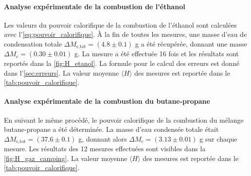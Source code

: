 \paragraph*{Analyse expérimentale de la combustion de l'éthanol}
Les valeurs du pouvoir calorifique de la combustion de l'éthanol sont calculées avec l'\autoref{eq:pouvoir_calorifique}. À la fin de toutes les mesures, une masse d'eau de condensation totale \(\Delta M_\textrm{c,tot} = (4.8 \pm 0.1)\) \si{\gram} a été récupérée, donnant une masse \(\Delta M_c = (0.30 \pm 0.01)\) \si{\gram}. La mesure a été effectuée 16 fois et les résultats sont reportés dans la \autoref{fig:H_etanol}. La formule pour le calcul des erreurs est donné dans l'\autoref{sec:erreurs}. La valeur moyenne \(\langle H \rangle\) des mesures est reportée dans le \autoref{tab:pouvoir_calorifique}.

\paragraph*{Analyse expérimentale de la combustion du butane-propane}
En suivant le même procédé, le pouvoir calorifique de la combustion du mélange butane-propane a été déterminée. La masse d'eau condensée totale était \(\Delta M_\textrm{c,tot} = (37.6 \pm 0.1)\) \si{\gram}, donnant alors \(\Delta M_c = (3.13 \pm 0.01)\) \si{\gram} sur chaque mesure. Les résultats des 12 mesures effectuées sont visibles dans la \autoref{fig:H_gaz_camping}. La valeur moyenne \(\langle H \rangle\) des mesures est reportée dans le \autoref{tab:pouvoir_calorifique}.

